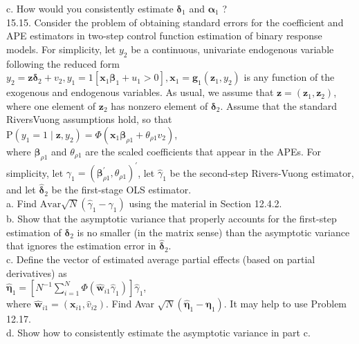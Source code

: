 \documentclass[10pt]{article}
\begin{document}
c. How would you consistently estimate $\boldsymbol{\delta}_{1}$ and $\boldsymbol{\alpha}_{1}$ ?\\
15.15. Consider the problem of obtaining standard errors for the coefficient and APE estimators in two-step control function estimation of binary response models. For simplicity, let $y_{2}$ be a continuous, univariate endogenous variable following the reduced form $y_{2}=\mathbf{z} \boldsymbol{\delta}_{2}+v_{2}, y_{1}=1\left[\mathbf{x}_{1} \boldsymbol{\beta}_{1}+u_{1}>0\right], \mathbf{x}_{1}=\mathbf{g}_{1}\left(\mathbf{z}_{1}, y_{2}\right)$ is any function of the exogenous and endogenous variables. As usual, we assume that $\mathbf{z}=\left(\mathbf{z}_{1}, \mathbf{z}_{2}\right)$, where one element of $\mathbf{z}_{2}$ has nonzero element of $\boldsymbol{\delta}_{2}$. Assume that the standard RiversVuong assumptions hold, so that\\
$\mathrm{P}\left(y_{1}=1 \mid \mathbf{z}, y_{2}\right)=\Phi\left(\mathbf{x}_{1} \boldsymbol{\beta}_{\rho 1}+\theta_{\rho 1} v_{2}\right)$,\\
where $\boldsymbol{\beta}_{\rho 1}$ and $\theta_{\rho 1}$ are the scaled coefficients that appear in the APEs. For simplicity, let $\gamma_{1}=\left(\boldsymbol{\beta}_{\rho 1}^{\prime}, \theta_{\rho 1}\right)^{\prime}$, let $\hat{\gamma}_{1}$ be the second-step Rivers-Vuong estimator, and let $\hat{\boldsymbol{\delta}}_{2}$ be the first-stage OLS estimator.\\
a. Find $\mathrm{Avar} \sqrt{N}\left(\hat{\gamma}_{1}-\gamma_{1}\right)$ using the material in Section 12.4.2.\\
b. Show that the asymptotic variance that properly accounts for the first-step estimation of $\boldsymbol{\delta}_{2}$ is no smaller (in the matrix sense) than the asymptotic variance that ignores the estimation error in $\hat{\boldsymbol{\delta}}_{2}$.\\
c. Define the vector of estimated average partial effects (based on partial derivatives) as\\
$\hat{\boldsymbol{\eta}}_{1}=\left[N^{-1} \sum_{i=1}^{N} \Phi\left(\hat{\mathbf{w}}_{i 1} \hat{\gamma}_{1}\right)\right] \hat{\gamma}_{1}$,\\
where $\hat{\mathbf{w}}_{i 1}=\left(\mathbf{x}_{i 1}, \hat{v}_{i 2}\right)$. Find Avar $\sqrt{N}\left(\hat{\boldsymbol{\eta}}_{1}-\boldsymbol{\eta}_{1}\right)$. It may help to use Problem 12.17.\\
d. Show how to consistently estimate the asymptotic variance in part c.\\
\end{document}
